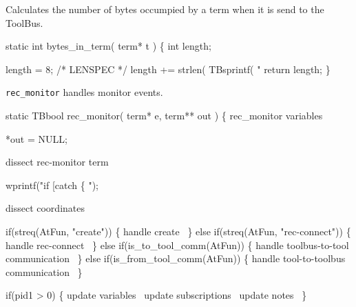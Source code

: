 Calculates the number of bytes occumpied by a term when it is send
to the ToolBus.

\nwenddocs{}\endmoddef\let\nwnotused=\nwoutput{}\nwstartdeflinemarkup{}\nwenddeflinemarkup
static int bytes_in_term( term* t )
\{ 
   int length;
   
   length = 8; /* LENSPEC */
   length += strlen( TBsprintf( "%
   return length;
\}
\nwendcode{}\nwdocspar


{\tt rec\_monitor} handles monitor events.

\nwenddocs{}\endmoddef\let\nwnotused=\nwoutput{}\nwstartdeflinemarkup{}\nwenddeflinemarkup
static TBbool rec_monitor( term* e, term** out )
\{
  \LA{}rec_monitor variables~{\nwtagstyle{}}\RA{}

  *out = NULL;

  \LA{}dissect rec-monitor term~{\nwtagstyle{}}\RA{}

  wprintf("if [catch \{ ");

  \LA{}dissect coordinates~{\nwtagstyle{}}\RA{}
   
   if(streq(AtFun, "create")) \{
     \LA{}handle create~{\nwtagstyle{}}\RA{}
   \} else  if(streq(AtFun, "rec-connect")) \{
     \LA{}handle rec-connect~{\nwtagstyle{}}\RA{}
   \}
   else if(is_to_tool_comm(AtFun)) \{
     \LA{}handle toolbus-to-tool communication~{\nwtagstyle{}}\RA{}
   \}
   else if(is_from_tool_comm(AtFun)) \{
     \LA{}handle tool-to-toolbus communication~{\nwtagstyle{}}\RA{}
   \}

   if(pid1 > 0) \{
     \LA{}update variables~{\nwtagstyle{}}\RA{}
     \LA{}update subscriptions~{\nwtagstyle{}}\RA{}
     \LA{}update notes~{\nwtagstyle{}}\RA{}
   \}
   
